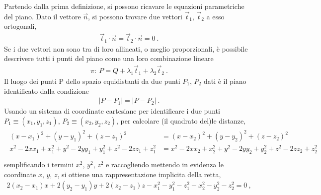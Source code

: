 \documentclass[letterpaper,10pt,italian]{jupyterBook}
\begin{document}
\sphinxAtStartPar
{}
Partendo dalla prima definizione, si possono ricavare le equazioni parametriche del piano. Dato il vettore \(\vec{n}\), si possono trovare due vettori \(\vec{t}_1\), \(\vec{t}_2\) a esso ortogonali,
\begin{equation*}
\begin{split}\vec{t}_1 \cdot \vec{n} = \vec{t}_2 \cdot \vec{n} = 0 \ .\end{split}
\end{equation*}
\sphinxAtStartPar
Se i due vettori non sono tra di loro allineati, o meglio proporzionali, è possibile descrivere tutti i punti del piano come una loro combinazione lineare
\begin{equation*}
\begin{split}\pi: \ P = Q + \lambda_1 \vec{t}_1 + \lambda_2 \vec{t}_2 \ .\end{split}
\end{equation*}
\sphinxAtStartPar
{} Il luogo dei punti P dello spazio equidistanti da due punti \(P_1\), \(P_2\) dati è il piano identificato dalla condizione
\begin{equation*}
\begin{split}|P - P_1| = | P - P_2 | \ .\end{split}
\end{equation*}
\sphinxAtStartPar
Usando un sistema di coordinate cartesiane per identificare i due punti \(P_1 \equiv (x_1,y_1,z_1)\), \(P_2 \equiv (x_2,y_2,z_2)\), per calcolare (il quadrato del)le distanze,
\begin{equation*}
\begin{split}\begin{aligned}
 (x - x_1)^2 + (y - y_1)^2 + (z - z_1)^2 &=  (x - x_2)^2 + (y - y_2)^2 + (z - z_2)^2 \\
 x^2 - 2 x x_1 + x_1^2 + y^2 - 2 y y_1 + y_1^2 + z^2 - 2 z z_1 + z_1^2 &=  x^2 - 2 x x_2 + x_2^2 + y^2 - 2 y y_2 + y_2^2 + z^2 - 2 z z_2 + z_2^2 \\
\end{aligned}\end{split}
\end{equation*}
\sphinxAtStartPar
semplificando i termini \(x^2\), \(y^2\), \(z^2\) e raccogliendo mettendo in evidenza le coordinate \(x\), \(y\), \(z\), si ottiene una rappresentazione implicita della retta,
\begin{equation}\label{equation:ch/analytic_geometry/analytic_geometry_3d/planes:eq:geometry:analytic:3d:planes:def-3-1}
\begin{split}  2 ( x_2 - x_1 ) x + 2 ( y_2 - y_1 ) y + 2 ( z_2 - z_1 ) z - x_1^2 - y_1^2 - z_1^2 - x_2^2 - y_2^2 - z_2^2 = 0 \ ,\end{split}
\end{equation}
\end{document}
